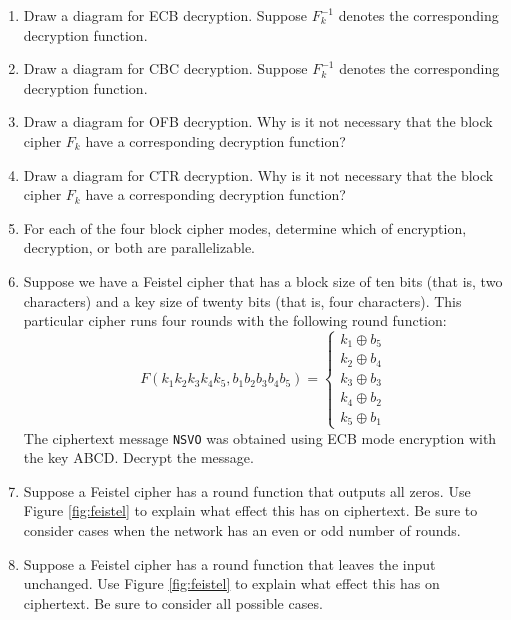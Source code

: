 \documentclass{book}
\theoremstyle{plain}
\theoremstyle{definition}
\newif\ifprintsolutions
\newcommand{\solution}[1]{\ifprintsolutions \begin{sloppypar}{\it #1}\end{sloppypar} \fi} %
\newcommand{\ciphertext}[1]{\texttt{#1}} %
\begin{document}
\begin{enumerate}
\item Draw a diagram for ECB decryption. Suppose $F^{-1}_k$ denotes the corresponding decryption function.
\item Draw a diagram for CBC decryption. Suppose $F^{-1}_k$ denotes the corresponding decryption function.
\item Draw a diagram for OFB decryption. Why is it not necessary that the block cipher $F_k$ have a corresponding decryption function?
\item Draw a diagram for CTR decryption. Why is it not necessary that the block cipher $F_k$ have a corresponding decryption function?
\item For each of the four block cipher modes, determine which of encryption, decryption, or both are parallelizable. \solution{For ECB, both are. For CBC, encryption is not but decryption is. For OFB, neither is. For CTR, both are.}
\item Suppose we have a Feistel cipher that has a block size of ten bits (that is, two characters) and a key size of twenty bits (that is, four characters). This particular cipher runs four rounds with the following round function: $$F(k_1k_2k_3k_4k_5,b_1b_2b_3b_4b_5) = \left\{ \begin{array}{l} k_1 \oplus b_5 \\ k_2 \oplus b_4 \\ k_3 \oplus b_3 \\ k_4 \oplus b_2 \\ k_5 \oplus b_1 \end{array} \right.$$
The ciphertext message \ciphertext{NSVO} was obtained using ECB mode encryption with the key ABCD. Decrypt the message. \solution{Plaintext message ``math"}
\item Suppose a Feistel cipher has a round function that outputs all zeros. Use Figure \ref{fig:feistel} to explain what effect this has on ciphertext. Be sure to consider cases when the network has an even or odd number of rounds. \solution{This Feistel cipher switches block halves at each round. For an even number of rounds, the ciphertext is the same as the plaintext. For an odd number of rounds, the left and right block halves are exchanged from the plaintext.}
\item Suppose a Feistel cipher has a round function that leaves the input unchanged. Use Figure \ref{fig:feistel} to explain what effect this has on ciphertext. Be sure to consider all possible cases. \solution{This Feistel cipher outputs the original plaintext every three rounds.}

\end{enumerate}
\end{document}
